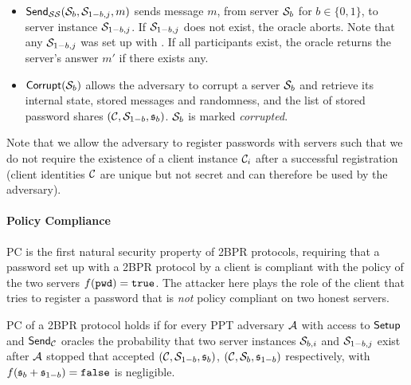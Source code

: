 \begin{itemize}
  \item $\mathsf{Send}_{\mathcal{S}\mathcal{S}}(\mathcal{S}_{b},\mathcal{S}_{1-b,j},m)$ sends message $m$, from server $\mathcal{S}_{b}$ for $b\in\{0,1\}$, to server instance $\mathcal{S}_{1-b,j}$.
        If $\mathcal{S}_{1-b,j}$ does not exist, the oracle aborts.
        Note that any $\mathcal{S}_{1-b,j}$ was set up with \Setup.
        If all participants exist, the oracle returns the server's answer $m'$ if there exists any.

  \item $\mathsf{Corrupt}(\mathcal{S}_{b})$ allows the adversary to corrupt a server $\mathcal{S}_b$ and retrieve its internal state, \ie stored messages and randomness, and the list of stored password shares $(\mathcal{C}, \mathcal{S}_{1-b}, \mathfrak{s}_b)$. %
      $\mathcal{S}_b$ is marked \emph{corrupted}.
\end{itemize}

\noindent
Note that we allow the adversary to register passwords with servers such that we do not require the existence of a client instance $\mathcal{C}_i$ after a successful registration (client identities $\mathcal{C}$ are unique but not secret and can therefore be used by the adversary).

\paragraph{Policy Compliance}
\ac{PC} is the first natural security property of \ac{2BPR} protocols, requiring that a password set up with a \ac{2BPR} protocol by a client is compliant with the policy of the two servers $f(\mathtt{pwd})=\mathtt{true}$.
The attacker here plays the role of the client that tries to register a password \pwd that is \emph{not} policy compliant on two honest servers.


\begin{definition}\label{def:pc}
\acl{PC} of a \ac{2BPR} protocol holds if for every \ac{PPT} adversary $\mathcal{A}$ with access to $\mathsf{Setup}$ and $\mathsf{Send}_\mathcal{C}$ oracles the probability that two server instances $\mathcal{S}_{b,i}$ and $\mathcal{S}_{1-b,j}$ exist after $\mathcal{A}$ stopped that accepted $(\mathcal{C},\mathcal{S}_{1-b},\mathfrak{s}_b)$, $(\mathcal{C},\mathcal{S}_{b},\mathfrak{s}_{1-b})$ respectively, with $f(\mathfrak{s}_b+\mathfrak{s}_{1-b})=\mathtt{false}$ is negligible.
\eod
\end{definition}

